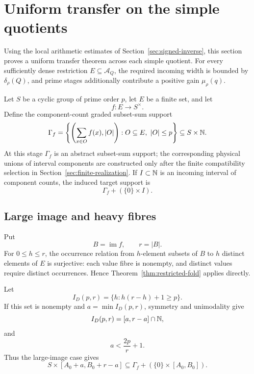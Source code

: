 \section{Uniform transfer on the simple quotients}
\label{sec:local-profile}

Using the local arithmetic estimates of Section~\ref{sec:signed-inverse}, this section proves a uniform transfer theorem across each simple quotient.  For every sufficiently dense restriction $E\subseteq\mathcal A_Q$, the required incoming width is bounded by $\delta_\rho(Q)$, and prime stages additionally contribute a positive gain $\mu_\rho(q)$.

Let $S$ be a cyclic group of prime order $p$, let $E$ be a finite set, and let
\[
f:E\longrightarrow S^\times.
\]
Define the component-count graded subset-sum support
\begin{equation}\label{eq:gamma-f}
\Gamma_f=
\left\{
\left(\sum_{x\in O}f(x),|O|\right):
O\subseteq E,\ |O|\le p
\right\}
\subseteq S\times\mathbb N.
\end{equation}
At this stage $\Gamma_f$ is an abstract subset-sum support; the corresponding physical unions of interval components are constructed only after the finite compatibility selection in Section~\ref{sec:finite-realization}.  If $I\subset\mathbb N$ is an incoming interval of component counts, the induced target support is
\[
\Gamma_f+(\{0\}\times I).
\]

\subsection{Large image and heavy fibres}

Put
\[
B=\operatorname{im}f,
\qquad r=|B|.
\]
For $0\le h\le r$, the occurrence relation from $h$-element subsets of $B$ to $h$ distinct elements of $E$ is surjective: each value fibre is nonempty, and distinct values require distinct occurrences.  Hence Theorem~\ref{thm:restricted-fold} applies directly.

Let
\[
I_D(p,r)=\{h:h(r-h)+1\ge p\}.
\]
If this set is nonempty and $a=\min I_D(p,r)$, symmetry and unimodality give
\[
I_D(p,r)=[a,r-a]\cap\mathbb N,
\]
and
\begin{equation}\label{eq:rich-demand}
a<\frac{2p}{r}+1.
\end{equation}
Thus the large-image case gives
\begin{equation}\label{eq:rich-rectangle}
S\times[A_0+a,B_0+r-a]
\subseteq
\Gamma_f+(\{0\}\times[A_0,B_0]).
\end{equation}


